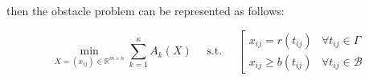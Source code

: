 then the obstacle problem can be represented as follows:

\begin{equation}
\min _{X=\left(x_{i j}\right) \in \mathbb{R}^{m \times n}} \sum_{k=1}^{\kappa} A_{k}(X) \quad \text { s.t. } \quad\left[\begin{array}{ll}
x_{i j}=r\left(t_{i j}\right) & \forall t_{i j} \in \Gamma \\
x_{i j} \geq b\left(t_{i j}\right) & \forall t_{i j} \in \mathcal{B}
\end{array}\right.
\end{equation}


